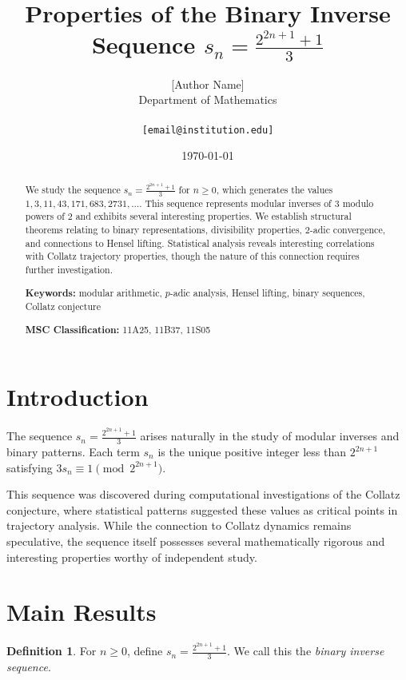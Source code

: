 \documentclass[11pt]{article}
\title{Properties of the Binary Inverse Sequence $s_n = \frac{2^{2n+1} + 1}{3}$}
\author{[Author Name]\\
Department of Mathematics\\
[Institution]\\
\texttt{[email@institution.edu]}
}
\date{\today}
\theoremstyle{definition}
\newtheorem{definition}[theorem]{Definition}
\begin{document}
\maketitle

\begin{abstract}
We study the sequence $s_n = \frac{2^{2n+1} + 1}{3}$ for $n \geq 0$, which generates the values $1, 3, 11, 43, 171, 683, 2731, \ldots$. This sequence represents modular inverses of $3$ modulo powers of $2$ and exhibits several interesting properties. We establish structural theorems relating to binary representations, divisibility properties, $2$-adic convergence, and connections to Hensel lifting. Statistical analysis reveals interesting correlations with Collatz trajectory properties, though the nature of this connection requires further investigation.

\textbf{Keywords:} modular arithmetic, $p$-adic analysis, Hensel lifting, binary sequences, Collatz conjecture

\textbf{MSC Classification:} 11A25, 11B37, 11S05
\end{abstract}

\section{Introduction}

The sequence $s_n = \frac{2^{2n+1} + 1}{3}$ arises naturally in the study of modular inverses and binary patterns. Each term $s_n$ is the unique positive integer less than $2^{2n+1}$ satisfying $3s_n \equiv 1 \pmod{2^{2n+1}}$.

This sequence was discovered during computational investigations of the Collatz conjecture, where statistical patterns suggested these values as critical points in trajectory analysis. While the connection to Collatz dynamics remains speculative, the sequence itself possesses several mathematically rigorous and interesting properties worthy of independent study.

\section{Main Results}

\begin{definition}\label{def:binary-inverse}
For $n \geq 0$, define $s_n = \frac{2^{2n+1} + 1}{3}$. We call this the \emph{binary inverse sequence}.
\end{definition}
\end{document}
